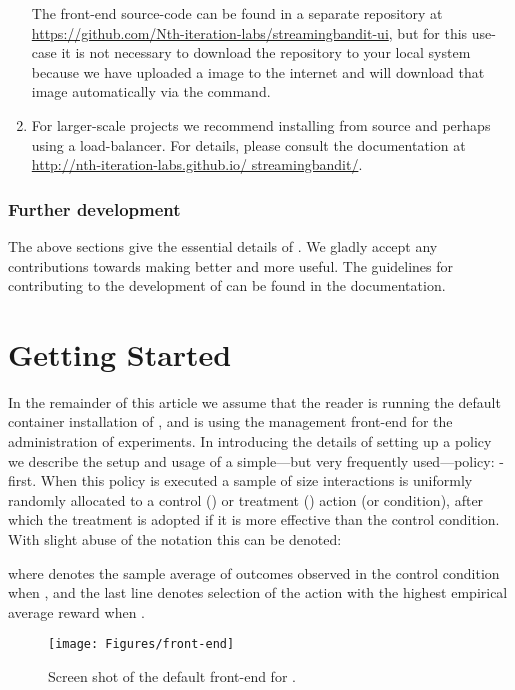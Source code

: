 \documentclass[nojss]{jss}
\begin{document}
\begin{enumerate}
The front-end source-code can be found in a separate repository at \url{https://github.com/Nth-iteration-labs/streamingbandit-ui}, but for this use-case it is not necessary to download the repository to your local system because we have uploaded a  image to the internet and  will download that image automatically via the  command.
\item For larger-scale projects we recommend installing from source and perhaps using a load-balancer. For details, please consult the documentation at \url{http://nth-iteration-labs.github.io/ streamingbandit/}.
\end{enumerate}

\subsubsection{Further development}
\label{subsec:dev}

The above sections give the essential details of . We gladly accept any contributions towards making  better and more useful. The guidelines for contributing to the development of  can be found in the documentation. 






\section{Getting Started}
\label{sec:usage}

In the remainder of this article we assume that the reader is running the default  container installation of , and is using the management front-end for the administration of experiments. In introducing the details of setting up a policy we describe the setup and usage of a simple---but very frequently used---policy: -first. When this policy is executed a sample of size  interactions is uniformly randomly allocated to a control () or treatment () action (or condition), after which the treatment is adopted if it is more effective than the control condition. With slight abuse of the notation this can be denoted:


where  denotes the sample average of outcomes observed in the control condition when , and the last line denotes selection of the action with the highest empirical average reward when . 

\begin{figure}[htp!]
  \centering
    \texttt{[image: Figures/front-end]}
    \label{fig:front-end}
      \caption{Screen shot of the default front-end for .}
\end{figure}
\end{document}
